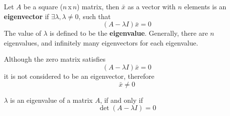 \documentclass[diffeq.tex]{subfiles}
\begin{document}
    \begin{definition}
        Let $A$ be a square ($n$\,x\,$n$) matrix, then $\bar{x}$ as a vector with $n$ elements is an \textbf{eigenvector} if $\exists \lambda, \lambda \neq 0$, such that
        \begin{equation}
            (A - \lambda I)\bar{x} = 0
        \end{equation}
        The value of $\lambda$ is defined to be the \textbf{eigenvalue}.
        Generally, there are $n$ eigenvalues, and infinitely many eigenvectors for each eigenvalue.
    \end{definition}
    \begin{remark}
        Although the zero matrix satisfies
        \begin{equation}
            (A - \lambda I)\bar{x} = 0
        \end{equation}
        it is not considered to be an eigenvector, therefore
        \begin{equation}
            \bar{x} \neq 0
        \end{equation}
    \end{remark}
    \begin{btheorem}[Eigenvalue]
        $\lambda$ is an eigenvalue of a matrix $A$, if and only if
        \begin{equation}
            \det(A - \lambda I) = 0
        \end{equation}
    \end{btheorem}
\end{document}
